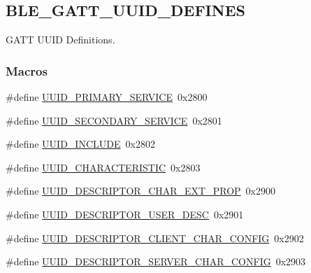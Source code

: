 \hypertarget{group___b_l_e___g_a_t_t___u_u_i_d___d_e_f_i_n_e_s}{}\subsection{B\+L\+E\+\_\+\+G\+A\+T\+T\+\_\+\+U\+U\+I\+D\+\_\+\+D\+E\+F\+I\+N\+ES}
\label{group___b_l_e___g_a_t_t___u_u_i_d___d_e_f_i_n_e_s}


G\+A\+TT U\+U\+ID Definitions.  


\subsubsection*{Macros}
\begin{DoxyCompactItemize}
\item 
\#define \hyperlink{group___b_l_e___g_a_t_t___u_u_i_d___d_e_f_i_n_e_s_ga19e818e22ce2f3b3ca5a387e44738c11}{U\+U\+I\+D\+\_\+\+P\+R\+I\+M\+A\+R\+Y\+\_\+\+S\+E\+R\+V\+I\+CE}~0x2800
\item 
\#define \hyperlink{group___b_l_e___g_a_t_t___u_u_i_d___d_e_f_i_n_e_s_ga9bef0e3524aa8c1cea8e2165c82692f7}{U\+U\+I\+D\+\_\+\+S\+E\+C\+O\+N\+D\+A\+R\+Y\+\_\+\+S\+E\+R\+V\+I\+CE}~0x2801
\item 
\#define \hyperlink{group___b_l_e___g_a_t_t___u_u_i_d___d_e_f_i_n_e_s_ga9f4ad1ba9ca83f6a5e34385edb30d1c4}{U\+U\+I\+D\+\_\+\+I\+N\+C\+L\+U\+DE}~0x2802
\item 
\#define \hyperlink{group___b_l_e___g_a_t_t___u_u_i_d___d_e_f_i_n_e_s_ga39f0e1623d55df79d0ab9de2c1f893af}{U\+U\+I\+D\+\_\+\+C\+H\+A\+R\+A\+C\+T\+E\+R\+I\+S\+T\+IC}~0x2803
\item 
\#define \hyperlink{group___b_l_e___g_a_t_t___u_u_i_d___d_e_f_i_n_e_s_gacb416c0f9e2a4c166638d23697bb6060}{U\+U\+I\+D\+\_\+\+D\+E\+S\+C\+R\+I\+P\+T\+O\+R\+\_\+\+C\+H\+A\+R\+\_\+\+E\+X\+T\+\_\+\+P\+R\+OP}~0x2900
\item 
\#define \hyperlink{group___b_l_e___g_a_t_t___u_u_i_d___d_e_f_i_n_e_s_ga37a288064681fa6993c38f97be43cde8}{U\+U\+I\+D\+\_\+\+D\+E\+S\+C\+R\+I\+P\+T\+O\+R\+\_\+\+U\+S\+E\+R\+\_\+\+D\+E\+SC}~0x2901
\item 
\#define \hyperlink{group___b_l_e___g_a_t_t___u_u_i_d___d_e_f_i_n_e_s_gacb9afcbdfaccd4106a30d425f47a2dec}{U\+U\+I\+D\+\_\+\+D\+E\+S\+C\+R\+I\+P\+T\+O\+R\+\_\+\+C\+L\+I\+E\+N\+T\+\_\+\+C\+H\+A\+R\+\_\+\+C\+O\+N\+F\+IG}~0x2902
\item 
\#define \hyperlink{group___b_l_e___g_a_t_t___u_u_i_d___d_e_f_i_n_e_s_ga5790f6a2e099251d7185d30b69bb3530}{U\+U\+I\+D\+\_\+\+D\+E\+S\+C\+R\+I\+P\+T\+O\+R\+\_\+\+S\+E\+R\+V\+E\+R\+\_\+\+C\+H\+A\+R\+\_\+\+C\+O\+N\+F\+IG}~0x2903

\end{DoxyCompactItemize}
